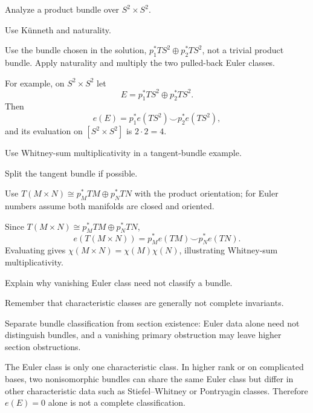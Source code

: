 \begin{exercise}\label{exr:viii32-18}
Analyze a product bundle over $S^2\times S^2$.
\end{exercise}
\begin{hint}
Use Künneth and naturality.

Use the bundle chosen in the solution, \(p_1^*TS^2\oplus p_2^*TS^2\), not a trivial product bundle. Apply naturality and multiply the two pulled-back Euler classes.
\end{hint}
\begin{solution}
For example, on \(S^2\times S^2\) let
\[
E=p_1^*TS^2\oplus p_2^*TS^2.
\]
Then
\[
e(E)=p_1^*e(TS^2)\smile p_2^*e(TS^2),
\]
and its evaluation on \([S^2\times S^2]\) is \(2\cdot2=4\).
\end{solution}

\begin{exercise}\label{exr:viii32-19}
Use Whitney-sum multiplicativity in a tangent-bundle example.
\end{exercise}
\begin{hint}
Split the tangent bundle if possible.

Use \(T(M\times N)\cong p_M^*TM\oplus p_N^*TN\) with the product orientation; for Euler numbers assume both manifolds are closed and oriented.
\end{hint}
\begin{solution}
Since \(T(M\times N)\cong p_M^*TM\oplus p_N^*TN\),
\[
e(T(M\times N))=p_M^*e(TM)\smile p_N^*e(TN).
\]
Evaluating gives \(\chi(M\times N)=\chi(M)\chi(N)\), illustrating Whitney-sum multiplicativity.
\end{solution}

\begin{exercise}\label{exr:viii32-20}
Explain why vanishing Euler class need not classify a bundle.
\end{exercise}
\begin{hint}
Remember that characteristic classes are generally not complete invariants.

Separate bundle classification from section existence: Euler data alone need not distinguish bundles, and a vanishing primary obstruction may leave higher section obstructions.
\end{hint}
\begin{solution}
The Euler class is only one characteristic class. In higher rank or on complicated bases, two nonisomorphic bundles can share the same Euler class but differ in other characteristic data such as Stiefel--Whitney or Pontryagin classes. Therefore \(e(E)=0\) alone is not a complete classification.
\end{solution}

